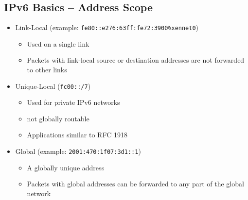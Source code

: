 \documentclass[xga]{xdvislides}
\begin{document}
\subsection{IPv6 Basics -- Address Scope}
\begin{itemize}
	\item Link-Local (example: \verb+fe80::e276:63ff:fe72:3900%xennet0+)
		\begin{itemize}
			\item Used on a single link
			\item Packets with link-local source or destination addresses are not
				forwarded to other links
		\end{itemize}
	\item Unique-Local (\verb+fc00::/7+)
		\begin{itemize}
			\item Used for private IPv6 networks
			\item not globally routable
			\item Applications similar to RFC 1918
		\end{itemize}
	\item Global (example: \verb+2001:470:1f07:3d1::1+)
		\begin{itemize}
			\item A globally unique address
			\item Packets with global addresses can be forwarded to any part of
				the global network
		\end{itemize}
\end{itemize}

%
\end{document}
